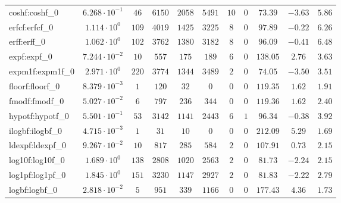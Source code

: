\begin{tabular}{|l|c|c|c|c|c|c|c|c|c|c|}
coshf:coshf\_0               & $ 6.268 \cdot 10^{-1} $ & $ 46     $ & $ 6150   $ & $ 2058  $ & $ 5491  $ & $ 10  $ & $ 0 $ & $ 73.39       $ & $ -3.63   $ & $ 5.86    $ \\
erfcf:erfcf\_0               & $ 1.114 \cdot 10^{0}  $ & $ 109    $ & $ 4019   $ & $ 1425  $ & $ 3225  $ & $ 8   $ & $ 0 $ & $ 97.89       $ & $ -0.22   $ & $ 6.26    $ \\
erff:erff\_0                 & $ 1.062 \cdot 10^{0}  $ & $ 102    $ & $ 3762   $ & $ 1380  $ & $ 3182  $ & $ 8   $ & $ 0 $ & $ 96.09       $ & $ -0.41   $ & $ 6.48    $ \\
expf:expf\_0                 & $ 7.244 \cdot 10^{-2} $ & $ 10     $ & $ 557    $ & $ 175   $ & $ 189   $ & $ 6   $ & $ 0 $ & $ 138.05      $ & $ 2.76    $ & $ 3.63    $ \\
expm1f:expm1f\_0             & $ 2.971 \cdot 10^{0}  $ & $ 220    $ & $ 3774   $ & $ 1344  $ & $ 3489  $ & $ 2   $ & $ 0 $ & $ 74.05       $ & $ -3.50   $ & $ 3.51    $ \\
floorf:floorf\_0             & $ 8.379 \cdot 10^{-3} $ & $ 1      $ & $ 120    $ & $ 32    $ & $ 0     $ & $ 0   $ & $ 0 $ & $ 119.35      $ & $ 1.62    $ & $ 1.91    $ \\
fmodf:fmodf\_0               & $ 5.027 \cdot 10^{-2} $ & $ 6      $ & $ 797    $ & $ 236   $ & $ 344   $ & $ 0   $ & $ 0 $ & $ 119.36      $ & $ 1.62    $ & $ 2.40    $ \\
hypotf:hypotf\_0             & $ 5.501 \cdot 10^{-1} $ & $ 53     $ & $ 3142   $ & $ 1141  $ & $ 2443  $ & $ 6   $ & $ 1 $ & $ 96.34       $ & $ -0.38   $ & $ 3.92    $ \\
ilogbf:ilogbf\_0             & $ 4.715 \cdot 10^{-3} $ & $ 1      $ & $ 31     $ & $ 10    $ & $ 0     $ & $ 0   $ & $ 0 $ & $ 212.09      $ & $ 5.29    $ & $ 1.69    $ \\
ldexpf:ldexpf\_0             & $ 9.267 \cdot 10^{-2} $ & $ 10     $ & $ 817    $ & $ 285   $ & $ 584   $ & $ 2   $ & $ 0 $ & $ 107.91      $ & $ 0.73    $ & $ 2.15    $ \\
log10f:log10f\_0             & $ 1.689 \cdot 10^{0}  $ & $ 138    $ & $ 2808   $ & $ 1020  $ & $ 2563  $ & $ 2   $ & $ 0 $ & $ 81.73       $ & $ -2.24   $ & $ 2.15    $ \\
log1pf:log1pf\_0             & $ 1.845 \cdot 10^{0}  $ & $ 151    $ & $ 3230   $ & $ 1147  $ & $ 2927  $ & $ 2   $ & $ 0 $ & $ 81.83       $ & $ -2.22   $ & $ 2.79    $ \\
logbf:logbf\_0               & $ 2.818 \cdot 10^{-2} $ & $ 5      $ & $ 951    $ & $ 339   $ & $ 1166  $ & $ 0   $ & $ 0 $ & $ 177.43      $ & $ 4.36    $ & $ 1.73    $ \\

\end{tabular}
